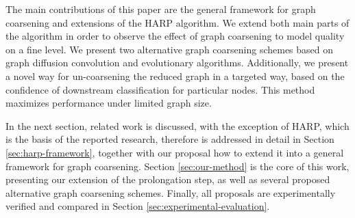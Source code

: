 The main contributions of this paper are the general framework for graph coarsening and extensions of the HARP algorithm. We extend both main parts of the algorithm in order to observe the effect of graph coarsening to model quality on a fine level. We present two alternative graph coarsening schemes based on graph diffusion convolution and evolutionary algorithms. Additionally, we present a novel way for un-coarsening the reduced graph in a targeted way, based on the confidence of downstream classification for particular nodes. This method maximizes performance under limited graph size.

In the next section, related work is discussed, with the exception of HARP, which is the basis of the reported research, therefore is addressed in detail in Section \ref{sec:harp-framework}, together with our proposal how to extend it into a general framework for graph coarsening. Section \ref{sec:our-method} is the core of this work, presenting our extension of the prolongation step, as well as several proposed alternative graph coarsening schemes. Finally, all proposals are experimentally verified and compared in Section \ref{sec:experimental-evaluation}.
